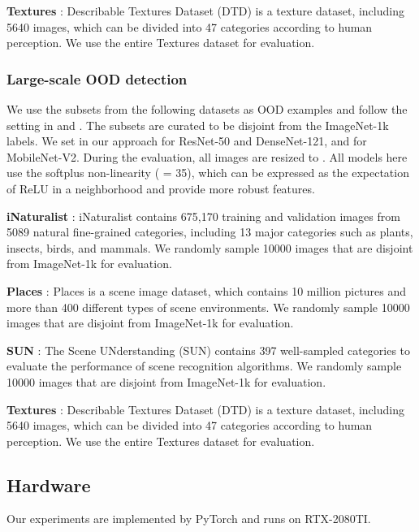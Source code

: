 \documentclass{article}
\begin{document}
\textbf{Textures} \cite{cimpoi2014Texture}: Describable Textures Dataset (DTD) is a texture dataset, including 5640 images, which can be divided into 47 categories according to human perception. We use the entire Textures dataset for evaluation.

\subsubsection{Large-scale OOD detection}

We use the subsets from the following datasets as OOD examples and follow the setting in \cite{sun2021react} and \cite{huang2021importance}. The subsets are curated to be disjoint from the ImageNet-1k labels. We set  in our approach for ResNet-50 and DenseNet-121, and  for MobileNet-V2. During the evaluation, all images are resized to . All models here use the softplus non-linearity ( = 35), which can be expressed as the expectation of ReLU in a neighborhood \cite{zhu2022rethinking} and provide more robust features.

\textbf{iNaturalist} \cite{van2018inaturalist}: iNaturalist contains 675,170 training and validation images from 5089 natural fine-grained categories, including 13 major categories such as plants, insects, birds, and mammals. We randomly sample 10000 images that are disjoint from ImageNet-1k for evaluation.

\textbf{Places} \cite{zhou2017places}: Places is a scene image dataset, which contains 10 million pictures and more than 400 different types of scene environments. We randomly sample 10000 images that are disjoint from ImageNet-1k for evaluation.

\textbf{SUN} \cite{xiao2010sun}: The Scene UNderstanding (SUN) contains 397 well-sampled categories to evaluate the performance of scene recognition algorithms. We randomly sample 10000 images that are disjoint from ImageNet-1k for evaluation.

\textbf{Textures} \cite{cimpoi2014Texture}: Describable Textures Dataset (DTD) is a texture dataset, including 5640 images, which can be divided into 47 categories according to human perception. We use the
entire Textures dataset for evaluation.


\subsection{Hardware}
Our experiments are implemented by PyTorch \cite{pytorch} and runs on RTX-2080TI.
\end{document}
